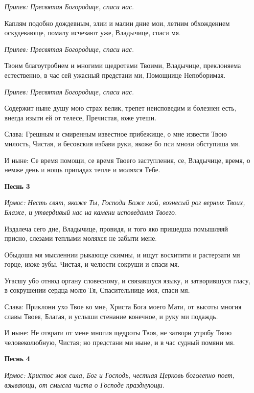 \itshape Припев:\normalfont{} Пресвятая Богородице, спаси нас. 

Каплям подобно дождевным, злии и малии дние мои, летним обхождением оскудевающе, помалу исчезают уже, Владычице, спаси мя. 

\itshape Припев:\normalfont{} Пресвятая Богородице, спаси нас. 

Твоим благоутробием и многими щедротами Твоими, Владычице, преклоняема естественно, в час сей ужасный предстани ми, Помощнице Непоборимая. 

\itshape Припев:\normalfont{} Пресвятая Богородице, спаси нас. 

Содержит ныне душу мою страх велик, трепет неисповедим и болезнен есть, внегда изыти ей от телесе, Пречистая, юже утеши. 

Слава: Грешным и смиренным известное прибежище, о мне извести Твою милость, Чистая, и бесовския избави руки, якоже бо пси мнози обступиша мя. 

И ныне: Се время помощи, се время Твоего заступления, се, Владычице, время, о немже день и нощь припадах тепле и моляхся Тебе.


\medskip


\bfseries Песнь 3\normalfont{}


\itshape Ирмос:\normalfont{} Несть свят, якоже Ты, Господи Боже мой, вознесый рог верных Твоих, Блаже, и утвердивый нас на камени исповедания Твоего. 

Издалеча сего дне, Владычице, провидя, и того яко пришедша помышляяй присно, слезами теплыми моляхся не забыти мене. 

Обыдоша мя мысленнии рыкающе скимны, и ищут восхитити и растерзати мя горце, ихже зубы, Чистая, и челюсти сокруши и спаси мя. 

Угасшу убо отнюд органу словесному, и связавшуся языку, и затворившуся гласу, в сокрушении сердца молю Тя, Спасительнице моя, спаси мя. 

Слава: Приклони ухо Твое ко мне, Христа Бога моего Мати, от высоты многия славы Твоея, Благая, и услыши стенание конечное, и руку ми подаждь. 

И ныне: Не отврати от мене многия щедроты Твоя, не затвори утробу Твою человеколюбную, Чистая; но предстани ми ныне, и в час судный помяни мя.


\medskip


\bfseries Песнь 4\normalfont{}


\itshape Ирмос:\normalfont{} Христос моя сила, Бог и Господь, честная Церковь боголепно поет, взывающи, от смысла чиста о Господе празднующи. 

